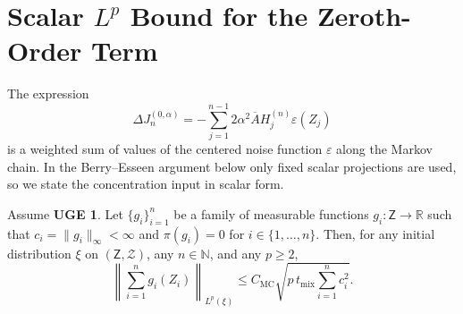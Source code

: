 \section{\texorpdfstring{Scalar $L^p$ Bound for the Zeroth-Order Term}{Scalar Lp Bound for the Zeroth-Order Term}}

The expression
\[
  \Delta J_n^{(0,\alpha)}
    =-\sum_{j=1}^{n-1}2\alpha^2\overline{A}
      H_j^{(n)}\varepsilon(Z_j)
\]
is a weighted sum of values of the centered noise function $\varepsilon$ along
the Markov chain. In the Berry--Esseen argument below only fixed scalar
projections are used, so we state the concentration input in scalar form.

\begin{lemma}
  \label{lem:zeroth-weighted-markov-concentration}
  Assume \textbf{UGE 1}. Let $\{g_i\}_{i=1}^n$ be a family of measurable
  functions $g_i\colon\mathsf{Z}\to\mathbb{R}$ such that
  $c_i=\lVert g_i\rVert_\infty<\infty$ and $\pi(g_i)=0$ for
  $i\in\{1,\ldots,n\}$. Then, for any initial distribution $\xi$ on
  $(\mathsf{Z},\mathcal{Z})$, any $n\in\mathbb{N}$, and any $p\geq2$,
  \begin{equation}
    \left\lVert\sum_{i=1}^n g_i(Z_i)\right\rVert_{L^p(\xi)}
      \leq C_{\mathrm{MC}}
        \sqrt{p\,t_{\mathrm{mix}}\sum_{i=1}^n c_i^2}.
    \label{eq:zeroth-markov-conc}
  \end{equation}
\end{lemma}


